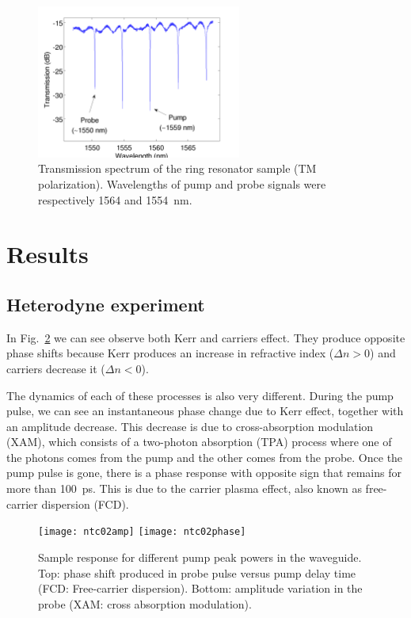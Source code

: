 \begin{figure}[htb]
    \centering
    \includegraphics[width=0.6\textwidth]{broadBig}
    \caption{Transmission spectrum of the ring resonator sample (TM polarization). Wavelengths of pump and probe signals were respectively 1564 and 1554~nm.}
    \label{fig:transmissionSwitching}
\end{figure}

\section{Results}
\subsection{Heterodyne experiment}
In Fig.~\ref{fig:ntc02TimeResSwitching} we can see observe both Kerr and carriers effect. They produce opposite phase shifts because Kerr produces an increase in refractive index ($\Delta n > 0$) and carriers decrease it ($\Delta n < 0$).


The dynamics of each of these processes is also very different. During the pump pulse, we can see an instantaneous phase change due to Kerr effect, together with an amplitude decrease. This decrease is due to cross-absorption modulation (XAM), which consists of a two-photon absorption (TPA) process where one of the photons comes from the pump and the other comes from the probe. Once the pump pulse is gone, there is a phase response with opposite sign that remains for more than 100~ps. This is due to the carrier plasma effect, also known as free-carrier dispersion (FCD).

\begin{figure}[htb]
    \centering
    \texttt{[image: ntc02amp]}
    \texttt{[image: ntc02phase]}
    \caption{Sample response for different pump peak powers in the waveguide. Top: phase shift produced in probe pulse versus pump delay time (FCD: Free-carrier dispersion). Bottom: amplitude variation in the probe (XAM: cross absorption modulation).}
    \label{fig:ntc02TimeResSwitching}
\end{figure}

